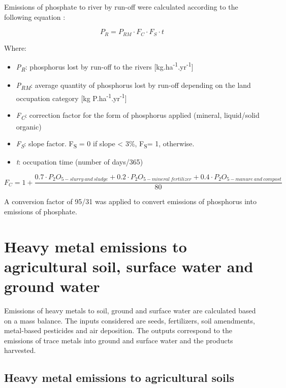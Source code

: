 \documentclass[openany]{book}
\begin{document}
Emissions of phosphate to river by run-off were calculated according to the following equation \citep{prasuhn2006}:

\[P_R=P_{RM} \cdot F_C \cdot F_S \cdot t\]

Where:

\begin{itemize}
\item
  \emph{P\textsubscript{R}}: phosphorus lost by run-off to the rivers {[}kg.ha\textsuperscript{-1}.yr\textsuperscript{-1}{]}
\item
  \emph{P\textsubscript{RM}}: average quantity of phosphorus lost by run-off depending on the land occupation category {[}kg P.ha\textsuperscript{-1}.yr\textsuperscript{-1}{]}
\item
  \emph{F\textsubscript{C}}: correction factor for the form of phosphorus applied (mineral, liquid/solid organic)
\item
  \emph{F\textsubscript{S}}: slope factor. F\textsubscript{S} = 0 if slope \textless{} 3\%, F\textsubscript{S}= 1, otherwise.
\item
  \emph{t}: occupation time (number of days/365)
\end{itemize}

\[F_C=1+ \frac{0.7 \cdot P_2O_{5-slurry\: and \: sludge} + 0.2 \cdot P_2O_{5-mineral \: fertilizer} + 0.4  \cdot P_2O_{5-manure\: and\: compost}}{80}\]

A conversion factor of 95/31 was applied to convert emissions of phosphorus into emissions of phosphate.

\hypertarget{heavy-metal-emissions-to-agricultural-soil-surface-water-and-ground-water}{%
\section{Heavy metal emissions to agricultural soil, surface water and ground water}\label{heavy-metal-emissions-to-agricultural-soil-surface-water-and-ground-water}}

Emissions of heavy metals to soil, ground and surface water are calculated based on a mass balance. The inputs considered are seeds, fertilizers, soil amendments, metal-based pesticides and air deposition. The outputs correspond to the emissions of trace metals into ground and surface water and the products harvested.

\hypertarget{heavy-metal-emissions-to-agricultural-soils}{%
\subsection{Heavy metal emissions to agricultural soils}\label{heavy-metal-emissions-to-agricultural-soils}}
\end{document}
